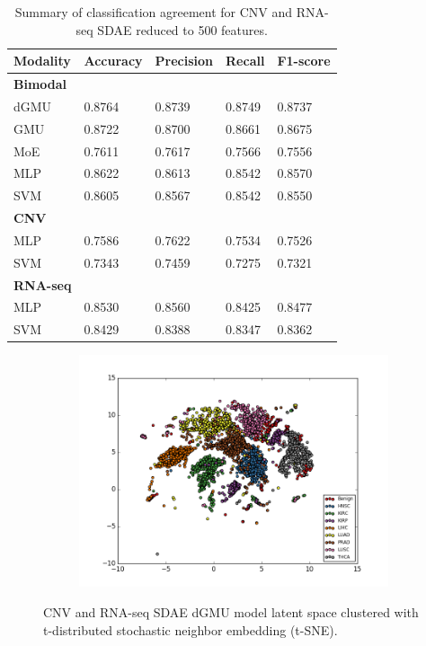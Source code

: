 \begin{table}[H]
   \caption{Summary of classification agreement for CNV and RNA-seq SDAE reduced to 500 features.} 
   \small %
   \centering %
   \begin{tabular}{lllll} %
   \toprule[\heavyrulewidth]\toprule[\heavyrulewidth]
   \textbf{Modality} & \textbf{Accuracy} & \textbf{Precision} & \textbf{Recall} & \textbf{F1-score} \\ 
   \midrule
   \multicolumn{1}{l}{\textbf{Bimodal}} \\
        dGMU & 0.8764 &	0.8739 & 0.8749 & 0.8737\\
        GMU  & 0.8722 &	0.8700 & 0.8661 & 0.8675\\
        MoE  & 0.7611 &	0.7617 & 0.7566 & 0.7556\\
        MLP  & 0.8622 &	0.8613 & 0.8542 & 0.8570\\
        SVM  & 0.8605 &	0.8567 & 0.8542 & 0.8550\\
   \midrule
   \multicolumn{1}{l}{\textbf{CNV}} \\
        MLP  & 0.7586 &	0.7622 & 0.7534 & 0.7526\\
        SVM  & 0.7343 &	0.7459 & 0.7275 & 0.7321\\
   \midrule
   \multicolumn{1}{l}{\textbf{RNA-seq}}  \\
        MLP  & 0.8530 &	0.8560 & 0.8425 & 0.8477\\
        SVM  & 0.8429 &	0.8388 & 0.8347 & 0.8362\\
   \bottomrule[\heavyrulewidth] 
   \end{tabular}
   \label{table:c_r_sdae_exp41}
\end{table}

\begin{figure}[H]
     \centering
     \begin{subfigure}[b]{\textwidth}
         \centering
         \includegraphics[width=\textwidth]{img/c_r/c_r_sdae_tsne.png}
     \end{subfigure}
        \caption{CNV and RNA-seq SDAE dGMU model latent space clustered with t-distributed stochastic neighbor embedding (t-SNE).}
        \label{fig:c_r_sdae_tsne}
\end{figure}

